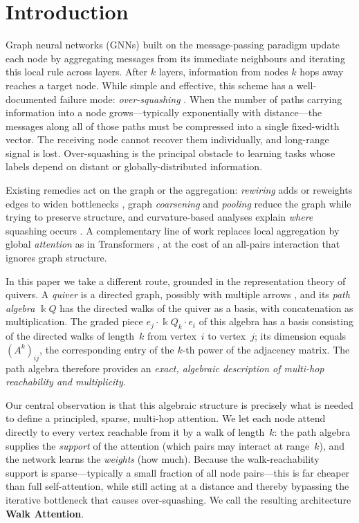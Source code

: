 \documentclass[runningheads]{llncs}
\newcommand{\kk}{\Bbbk}                 %
\newcommand{\kQ}{\kk Q}                 %
\newcommand{\Adj}{A}                    %
\begin{document}
\section{Introduction}

Graph neural networks (GNNs) built on the message-passing paradigm
\cite{gilmer2017neural} update each node by aggregating messages from its
immediate neighbours and iterating this local rule across layers. After $k$
layers, information from nodes $k$ hops away reaches a target node. While simple
and effective, this scheme has a well-documented failure mode:
\emph{over-squashing} \cite{alon2021bottleneck}. When the number of paths
carrying information into a node grows---typically exponentially with
distance---the messages along all of those paths must be compressed into a
single fixed-width vector. The receiving node cannot recover them individually,
and long-range signal is lost. Over-squashing is the principal obstacle to learning tasks whose
labels depend on distant or globally-distributed information.

Existing remedies act on the graph or the aggregation: \emph{rewiring} adds or
reweights edges to widen bottlenecks \cite{topping2022understanding}, graph
\emph{coarsening} and \emph{pooling} reduce the graph while trying to preserve
structure, and curvature-based analyses explain \emph{where} squashing occurs
\cite{digiovanni2023oversquashing}. A complementary line of work replaces local
aggregation by global \emph{attention} as in Transformers
\cite{vaswani2017attention}, at the cost of an all-pairs interaction that
ignores graph structure.

In this paper we take a different route, grounded in the representation theory of
quivers. A \emph{quiver} is a directed graph, possibly with multiple arrows
\cite{schiffler2014quiver,assem2006elements}, and its \emph{path algebra} $\kQ$
has the directed walks of the quiver as a basis, with concatenation as
multiplication. The graded piece $e_j \cdot \kQ_k \cdot e_i$ of this algebra has
a basis consisting of the directed walks of length~$k$ from vertex~$i$ to
vertex~$j$; its dimension equals $(\Adj^k)_{ij}$, the corresponding entry of the
$k$-th power of the adjacency matrix. The path algebra therefore provides an
\emph{exact, algebraic description of multi-hop reachability and multiplicity}.

Our central observation is that this algebraic structure is precisely what is
needed to define a principled, sparse, multi-hop attention. We let each node
attend directly to every vertex reachable from it by a walk of length~$k$: the
path algebra supplies the \emph{support} of the attention (which pairs may
interact at range~$k$), and the network learns the \emph{weights} (how much).
Because the walk-reachability support is sparse---typically a small fraction of
all node pairs---this is far cheaper than full self-attention, while still acting
at a distance and thereby bypassing the iterative bottleneck that causes
over-squashing. We call the resulting architecture \textbf{Walk Attention}.
\end{document}
